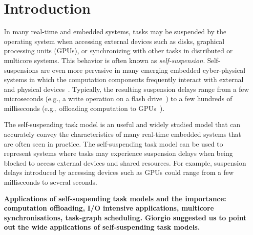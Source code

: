 \section{Introduction}

In many real-time and embedded systems, tasks may be suspended by the operating system when accessing external devices such as disks, graphical processing units (GPUs), or synchronizing with other tasks in distributed or multicore systems. 
This behavior is often known as \emph{self-suspension}. Self-suspensions are even more pervasive in many emerging embedded cyber-physical systems in which the computation components frequently interact with external and physical devices~\cite{Kang:rtss07,Kato_2011}. Typically, the resulting suspension delays range from a few microseconds (e.g., a write operation on a flash drive~\cite{Kang:rtss07}) to a few hundreds of milliseconds (e.g., offloading computation to GPUs~\cite{Kato_2011,Liu_2014}).

The self-suspending task model is an useful and widely studied model that can accurately convey the characteristics of many real-time embedded systems that are often seen in practice. The self-suspending task model can be used to represent systems where tasks may experience suspension delays when being blocked to access external devices and shared resources. For example, suspension delays introduced by accessing devices such as GPUs could range from a few milliseconds to several seconds. 

\textbf{Applications of self-suspending task models and the importance: computation offloading, I/O intensive applications, multicore synchronisations, task-graph scheduling. Giorgio suggested us to point out the wide applications of self-suspending task models.}
  
  